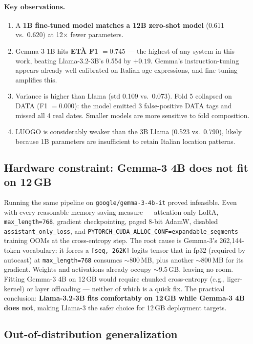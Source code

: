 \documentclass[11pt,a4paper]{article}
\begin{document}
\paragraph{Key observations.}
\begin{enumerate}[leftmargin=*,topsep=2pt,itemsep=0pt]
\item A \textbf{1B fine-tuned model matches a 12B zero-shot model} (0.611 vs.\ 0.620) at 12$\times$ fewer parameters.
\item Gemma-3 1B hits \textbf{ETÀ F1 $= 0.745$} — the highest of any system in this work, beating Llama-3.2-3B's 0.554 by $+0.19$. Gemma's instruction-tuning appears already well-calibrated on Italian age expressions, and fine-tuning amplifies this.
\item Variance is higher than Llama (std 0.109 vs.\ 0.073). Fold 5 collapsed on DATA (F1 $= 0.000$): the model emitted 3 false-positive DATA tags and missed all 4 real dates. Smaller models are more sensitive to fold composition.
\item LUOGO is considerably weaker than the 3B Llama (0.523 vs.\ 0.790), likely because 1B parameters are insufficient to retain Italian location patterns.
\end{enumerate}

\subsection{Hardware constraint: Gemma-3 4B does not fit on 12\,GB}

Running the same pipeline on \texttt{google/gemma-3-4b-it} proved infeasible. Even with every reasonable memory-saving measure — attention-only LoRA, \texttt{max\_length=768}, gradient checkpointing, paged 8-bit AdamW, disabled \texttt{assistant\_only\_loss}, and \texttt{PYTORCH\_CUDA\_ALLOC\_CONF=expandable\_segments} — training OOMs at the cross-entropy step. The root cause is Gemma-3's 262{,}144-token vocabulary: it forces a \texttt{[seq, 262K]} logits tensor that in fp32 (required by autocast) at \texttt{max\_length=768} consumes $\sim$800\,MB, plus another $\sim$800\,MB for its gradient. Weights and activations already occupy $\sim$9.5\,GB, leaving no room. Fitting Gemma-3 4B on 12\,GB would require chunked cross-entropy (e.g., liger-kernel) or layer offloading — neither of which is a quick fix. The practical conclusion: \textbf{Llama-3.2-3B fits comfortably on 12\,GB while Gemma-3 4B does not}, making Llama-3 the safer choice for 12\,GB deployment targets.

\subsection{Out-of-distribution generalization}
\end{document}

